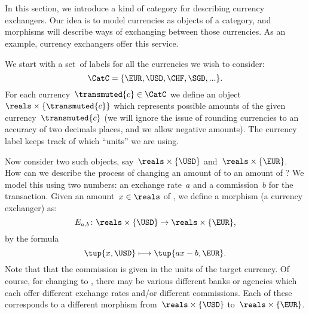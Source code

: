 
\section{}
\label{sec:currency_cat}
In this section, we introduce a kind of category for describing currency exchangers. Our idea is to model currencies as objects of a category, and morphisms will describe ways of exchanging between those currencies. As an example, currency exchangers offer this service.

We start with a set~\CatC of labels for all the currencies we wish to consider:
\begin{equation*}
  \CatC = \{ \EUR, \USD, \CHF, \SGD, ... \}.
\end{equation*}
For each currency~$\transmuted{c} \in \CatC$ we define an object~$\reals \times \{\transmuted{c}\}$ which represents possible amounts of the given currency~$\transmuted{c}$ (we will ignore the issue of rounding currencies to an accuracy of two decimals places, and we allow negative amounts). The currency label keeps track of which ``units'' we are using.

Now consider two such objects, say~$\reals \times \{\USD\}$ and~$\reals \times \{\EUR\}$. How can we describe the process of changing an amount of \USD to an amount of \EUR? We model this using two numbers: an exchange rate~$a$ and a commission~$b$ for the transaction. Given an amount~$x \in \reals$ of \USD, we define a morphism (a currency exchanger) as:
\begin{equation*}
  E_{a,b} \colon \reals \times \{\USD\} \rightarrow \reals \times \{\EUR\},
\end{equation*}
by the formula
\begin{equation*}
  \tup{x, \USD} \longmapsto \tup{ax - b, \EUR}.
\end{equation*}
Note that that the commission is given in the units of the target currency. Of course, for changing \USD to \EUR, there may be various different banks or agencies which each offer different exchange rates and/or different commissions. Each of these corresponds to a different morphism from~$\reals \times \{\USD\}$ to~$\reals \times \{\EUR\}$.

